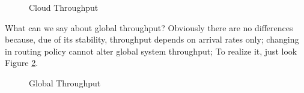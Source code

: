 \documentclass[10pt,a4paper]{article}
\begin{document}
\begin{figure}[h!]
    \centering
    \caption{Cloud Throughput}%
    \label{fig:CloudThroughput}
\end{figure}

What can we say about global throughput? Obviously there are no differences because, due of its stability, throughput depends on arrival rates only; changing in routing policy cannot alter global system throughput; To realize it, just look Figure \ref{fig:Throughput}.

\begin{figure}[h!]
    \centering
    \caption{Global Throughput}%
    \label{fig:Throughput}
\end{figure}
\end{document}
